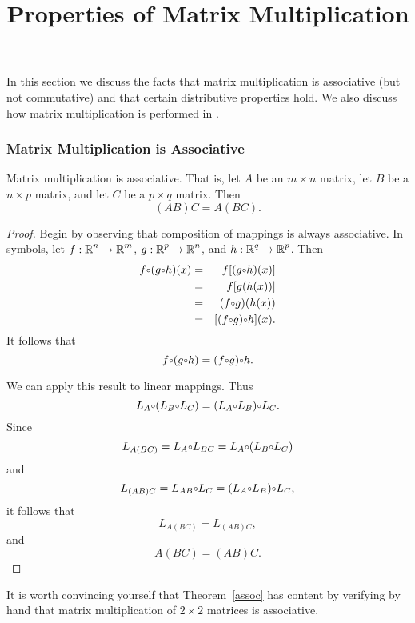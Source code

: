\documentclass{ximera}
\title{Properties of Matrix Multiplication}
\begin{document}
\begin{abstract}
\end{abstract}
\maketitle

 \label{S:4.7}

In this section we discuss the facts that matrix multiplication is
associative (but not commutative) and that certain distributive
properties hold.  We also discuss how matrix multiplication is
performed in \Matlab.

\subsubsection*{Matrix Multiplication is Associative}

\begin{theorem} \label{assoc}
Matrix multiplication is associative.  That is, let $A$ be an
$m\times n$ matrix, let $B$ be a $n\times p$ matrix, and let $C$
be a $p\times q$ matrix.  Then
\[
(AB)C = A(BC).
\]
\end{theorem}

\begin{proof} Begin by observing that composition of mappings is always
associative.  In symbols, let $f:\mbox{$\Bbb{R}$}^n\to\mbox{$\Bbb{R}$}^m$, $g:\mbox{$\Bbb{R}$}^p\to\mbox{$\Bbb{R}$}^n$,
and $h:\mbox{$\Bbb{R}$}^q\to\mbox{$\Bbb{R}$}^p$.  Then
\begin{eqnarray*}
f\compose (g\compose h)(x) & = & f[(g\compose h)(x)] \\
  & = & f[g(h(x))] \\
  & = & (f\compose g)(h(x)) \\
  & = & [(f\compose g)\compose h](x).
\end{eqnarray*}
It follows that
\[
f\compose (g\compose h) = (f\compose g)\compose h.
\]

We can apply this result to linear mappings.  Thus
\[
L_A\compose (L_B\compose L_C) = (L_A\compose L_B)\compose L_C.
\]
Since
\[
L_{A(BC)} = L_A\compose L_{BC} = L_A\compose (L_B\compose L_C)
\]
and
\[
L_{(AB)C} = L_{AB}\compose L_C = (L_A\compose L_B)\compose L_C,
\]
it follows that
\[
L_{A(BC)} = L_{(AB)C},
\]
and
\[
A(BC) = (AB)C.
\]
\end{proof}

It is worth convincing yourself that Theorem~\ref{assoc} has
content by verifying by hand that matrix multiplication of
$2\times 2$ matrices is associative.
\end{document}

